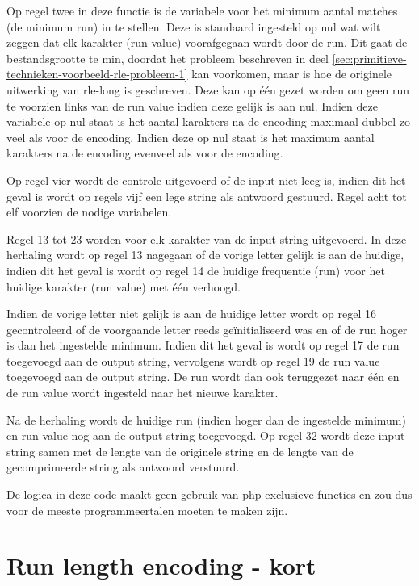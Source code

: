 Op regel twee in deze functie is de variabele voor het minimum aantal matches (de minimum run) in te stellen. Deze is standaard ingesteld op nul wat wilt zeggen dat elk karakter (run value) voorafgegaan wordt door de run. Dit gaat de bestandsgrootte te min, doordat het probleem beschreven in deel \ref{sec:primitieve-technieken-voorbeeld-rle-probleem-1} kan voorkomen, maar is hoe de originele uitwerking van \gls{rle-long} is geschreven. Deze kan op één gezet worden om geen run te voorzien links van de run value indien deze gelijk is aan nul. Indien deze variabele op nul staat is het aantal karakters na de \gls{encoding} maximaal dubbel zo veel als voor de \gls{encoding}. Indien deze op nul staat is het maximum aantal karakters na de \gls{encoding} evenveel als voor de \gls{encoding}.

Op regel vier wordt de controle uitgevoerd of de input niet leeg is, indien dit het geval is wordt op regels vijf een lege \gls{string} als antwoord gestuurd. Regel acht tot elf voorzien de nodige variabelen.

Regel 13 tot 23 worden voor elk karakter van de input \gls{string} uitgevoerd. In deze herhaling wordt op regel 13 nagegaan of de vorige letter gelijk is aan de huidige, indien dit het geval is wordt op regel 14 de huidige frequentie (run) voor het huidige karakter (run value) met één verhoogd. 

Indien de vorige letter niet gelijk is aan de huidige letter wordt op regel 16 gecontroleerd of de voorgaande letter reeds geïnitialiseerd was en of de run hoger is dan het ingestelde minimum. Indien dit het geval is wordt op regel 17 de run toegevoegd aan de output \gls{string}, vervolgens wordt op regel 19 de run value toegevoegd aan de output \gls{string}. De run wordt dan ook teruggezet naar één en de run value wordt ingesteld naar het nieuwe karakter.

Na de herhaling wordt de huidige run (indien hoger dan de ingestelde minimum) en run value nog aan de output \gls{string} toegevoegd. Op regel 32 wordt deze input \gls{string} samen met de lengte van de originele \gls{string} en de lengte van de gecomprimeerde \gls{string} als antwoord verstuurd.

De logica in deze code maakt geen gebruik van \gls{php} exclusieve functies en zou dus voor de meeste programmeertalen moeten te maken zijn.


\section{Run length encoding - kort}
\label{sec:compressietool-rle}

